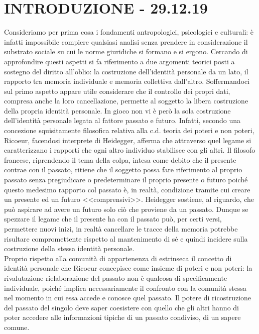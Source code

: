 
\section {INTRODUZIONE - 29.12.19}
Consideriamo per prima cosa i fondamenti antropologici, psicologici e culturali: è infatti impossibile compiere qualsiasi analisi senza prendere in considerazione il substrato sociale su cui le norme giuridiche si formano e si ergono. Cercando  di approfondire questi aspetti si fa riferimento a due argomenti teorici posti a sostegno del diritto all'oblio: la costruzione dell'identità personale da un lato, il rapporto tra memoria individuale e memoria collettiva dall'altro.
Soffermandoci sul primo aspetto appare utile considerare che il controllo dei propri dati, compresa anche la loro cancellazione, permette al soggetto la libera costruzione della propria identità personale. In gioco non vi è però la sola costruzione dell'identità personale legata al fattore passato e futuro. Infatti, secondo una concezione squisitamente filosofica relativa alla c.d. teoria dei poteri e non poteri, Ricoeur, facendosi interprete di Heidegger, afferma che attraverso quel legame si caratterizzano i rapporti che ogni altro individuo stabilisce con gli altri.
Il filosofo francese, riprendendo il tema della colpa, intesa come debito che il presente contrae con il passato, ritiene che il soggetto possa fare riferimento al proprio passato senza pregiudicare o predeterminare il proprio presente o futuro poiché questo medesimo rapporto col passato è, in realtà, condizione tramite cui creare un presente ed un futuro <<comprensivi>>.
Heidegger sostiene, al riguardo, che può aspirare ad avere un futuro solo ciò che proviene da un passato. Dunque se spezzare il legame che il presente ha con il passato può, per certi versi, permettere nuovi inizi, in realtà cancellare le tracce della memoria potrebbe risultare compromettente rispetto al mantenimento di sé e quindi incidere sulla costruzione della stessa identità personale.
\\ Proprio rispetto alla comunità di appartenenza di estrinseca il concetto di identità personale che Ricoeur concepisce come insieme di poteri e non poteri: la rivalutazione-rielaborazione del passato non è qualcosa di specificamente individuale, poiché implica necessariamente il confronto con la comunità stessa nel momento in cui essa accede e conosce quel passato. Il potere di ricostruzione del passato del singolo deve saper coesistere con quello che gli altri hanno di poter accedere alle informazioni tipiche di un passato condiviso, di un sapere comune.
